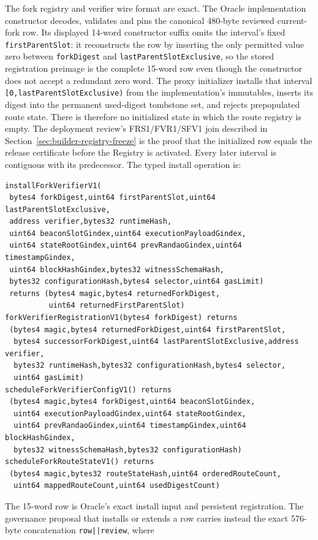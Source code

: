 \documentclass[a4paper,11pt]{article}
\newcommand{\code}[1]{\nolinkurl{#1}}
\begin{document}
The fork registry and verifier wire format are exact.  The Oracle
implementation constructor decodes, validates and pins the canonical 480-byte
reviewed current-fork row.  Its displayed 14-word constructor suffix omits the
interval's fixed \code{firstParentSlot}: it reconstructs the row by inserting
the only permitted value zero between \code{forkDigest} and
\code{lastParentSlotExclusive}, so the stored registration preimage is the
complete 15-word row even though the constructor does not accept a redundant
zero word.  The proxy initializer installs that interval
\code{[0,lastParentSlotExclusive)} from the implementation's immutables,
inserts its digest into the permanent used-digest tombstone set, and rejects
prepopulated route state.  There is therefore no initialized state in which
the route registry is empty.  The deployment review's FRS1/FVR1/SFV1 join
described in Section~\ref{sec:builder-registry-freeze} is the proof that the
initialized row equals the release certificate before the Registry is
activated.
Every later interval is contiguous with
its predecessor.  The typed install operation is:
\begin{verbatim}
installForkVerifierV1(
 bytes4 forkDigest,uint64 firstParentSlot,uint64 lastParentSlotExclusive,
 address verifier,bytes32 runtimeHash,
 uint64 beaconSlotGindex,uint64 executionPayloadGindex,
 uint64 stateRootGindex,uint64 prevRandaoGindex,uint64 timestampGindex,
 uint64 blockHashGindex,bytes32 witnessSchemaHash,
 bytes32 configurationHash,bytes4 selector,uint64 gasLimit)
 returns (bytes4 magic,bytes4 returnedForkDigest,
          uint64 returnedFirstParentSlot)
forkVerifierRegistrationV1(bytes4 forkDigest) returns
 (bytes4 magic,bytes4 returnedForkDigest,uint64 firstParentSlot,
  bytes4 successorForkDigest,uint64 lastParentSlotExclusive,address verifier,
  bytes32 runtimeHash,bytes32 configurationHash,bytes4 selector,
  uint64 gasLimit)
scheduleForkVerifierConfigV1() returns
 (bytes4 magic,bytes4 forkDigest,uint64 beaconSlotGindex,
  uint64 executionPayloadGindex,uint64 stateRootGindex,
  uint64 prevRandaoGindex,uint64 timestampGindex,uint64 blockHashGindex,
  bytes32 witnessSchemaHash,bytes32 configurationHash)
scheduleForkRouteStateV1() returns
 (bytes4 magic,bytes32 routeStateHash,uint64 orderedRouteCount,
  uint64 mappedRouteCount,uint64 usedDigestCount)
\end{verbatim}
The 15-word row is Oracle's exact install input and persistent registration.
The governance proposal that installs or extends a row carries instead the
exact 576-byte concatenation \code{row||review}, where
\end{document}
